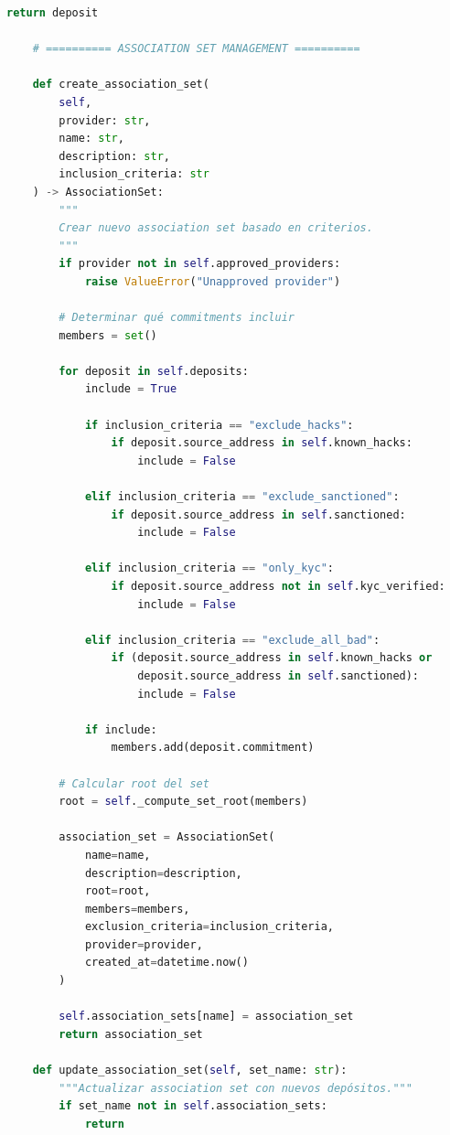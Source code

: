\documentclass[11pt,a4paper,twoside]{book}
\theoremstyle{definition}
\theoremstyle{remark}
\begin{document}
\begin{lstlisting}[language=Python, caption={Sistema completo de Privacy Pools}]
        return deposit
    
    # ========== ASSOCIATION SET MANAGEMENT ==========
    
    def create_association_set(
        self,
        provider: str,
        name: str,
        description: str,
        inclusion_criteria: str
    ) -> AssociationSet:
        """
        Crear nuevo association set basado en criterios.
        """
        if provider not in self.approved_providers:
            raise ValueError("Unapproved provider")
        
        # Determinar qué commitments incluir
        members = set()
        
        for deposit in self.deposits:
            include = True
            
            if inclusion_criteria == "exclude_hacks":
                if deposit.source_address in self.known_hacks:
                    include = False
                    
            elif inclusion_criteria == "exclude_sanctioned":
                if deposit.source_address in self.sanctioned:
                    include = False
                    
            elif inclusion_criteria == "only_kyc":
                if deposit.source_address not in self.kyc_verified:
                    include = False
                    
            elif inclusion_criteria == "exclude_all_bad":
                if (deposit.source_address in self.known_hacks or
                    deposit.source_address in self.sanctioned):
                    include = False
            
            if include:
                members.add(deposit.commitment)
        
        # Calcular root del set
        root = self._compute_set_root(members)
        
        association_set = AssociationSet(
            name=name,
            description=description,
            root=root,
            members=members,
            exclusion_criteria=inclusion_criteria,
            provider=provider,
            created_at=datetime.now()
        )
        
        self.association_sets[name] = association_set
        return association_set
    
    def update_association_set(self, set_name: str):
        """Actualizar association set con nuevos depósitos."""
        if set_name not in self.association_sets:
            return
        

\end{lstlisting}
\end{document}
